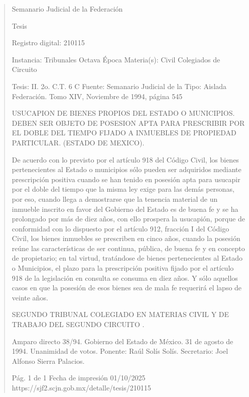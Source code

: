 \documentclass[11pt,a4paper]{article}
\begin{document}
\begin{quote}
                                                   Semanario Judicial de la Federación

                                                  Tesis

 Registro digital: 210115

 Instancia: Tribunales            Octava Época                          Materia(s): Civil
 Colegiados de Circuito

 Tesis: II. 2o. C.T. 6 C          Fuente: Semanario Judicial de la      Tipo: Aislada
                                  Federación.
                                  Tomo XIV, Noviembre de 1994,
                                  página 545


USUCAPION DE BIENES PROPIOS DEL ESTADO O MUNICIPIOS. DEBEN SER OBJETO DE
POSESION APTA PARA PRESCRIBIR POR EL DOBLE DEL TIEMPO FIJADO A INMUEBLES DE
PROPIEDAD PARTICULAR. (ESTADO DE MEXICO).


De acuerdo con lo previsto por el artículo 918 del Código Civil, los bienes pertenecientes al Estado o
municipios sólo pueden ser adquiridos mediante prescripción positiva cuando se han tenido en
posesión apta para usucapir por el doble del tiempo que la misma ley exige para las demás
personas, por eso, cuando llega a demostrarse que la tenencia material de un inmueble inscrito en
favor del Gobierno del Estado es de buena fe y se ha prolongado por más de diez años, con ello
prospera la usucapión, porque de conformidad con lo dispuesto por el artículo 912, fracción I del
Código Civil, los bienes inmuebles se prescriben en cinco años, cuando la posesión reúne las
características de ser continua, pública, de buena fe y en concepto de propietario; en tal virtud,
tratándose de bienes pertenecientes al Estado o Municipios, el plazo para la prescripción positiva
fijado por el artículo 918 de la legislación en consulta se consuma en diez años. Y sólo aquellos
casos en que la posesión de esos bienes sea de mala fe requerirá el lapso de veinte años.

SEGUNDO TRIBUNAL COLEGIADO EN MATERIAS CIVIL Y DE TRABAJO DEL SEGUNDO
CIRCUITO .


Amparo directo 38/94. Gobierno del Estado de México. 31 de agosto de 1994. Unanimidad de votos.
Ponente: Raúl Solís Solís. Secretario: Joel Alfonso Sierra Palacios.




                                             Pág. 1 de 1             Fecha de impresión 01/10/2025
  https://sjf2.scjn.gob.mx/detalle/tesis/210115

\end{quote}
\end{document}
